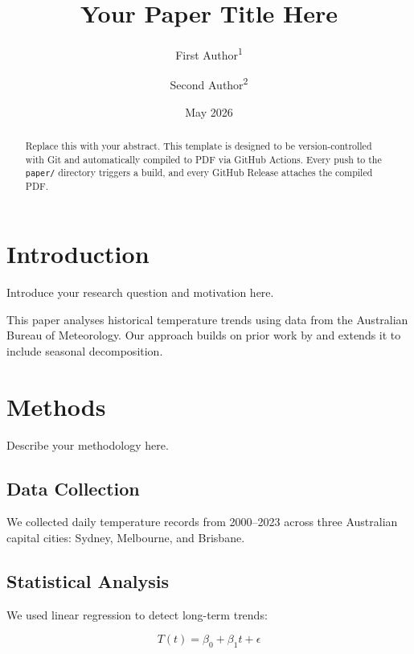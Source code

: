\documentclass[12pt, a4paper]{article}
\title{Your Paper Title Here}
\author{
  First Author\textsuperscript{1} \and
  Second Author\textsuperscript{2}
}
\date{May 2026}
\begin{document}
\maketitle

\begin{abstract}
  Replace this with your abstract. This template is designed to be
  version-controlled with Git and automatically compiled to PDF via
  GitHub Actions. Every push to the \texttt{paper/} directory triggers
  a build, and every GitHub Release attaches the compiled PDF.
\end{abstract}

\tableofcontents
\newpage

\section{Introduction}
\label{sec:introduction}

Introduce your research question and motivation here.

This paper analyses historical temperature trends using data from the
Australian Bureau of Meteorology. Our approach builds on prior work by
\citet{example2024} and extends it to include seasonal decomposition.

\section{Methods}
\label{sec:methods}

Describe your methodology here.

\subsection{Data Collection}

We collected daily temperature records from 2000--2023 across three
Australian capital cities: Sydney, Melbourne, and Brisbane.

\subsection{Statistical Analysis}

We used linear regression to detect long-term trends:

\begin{equation}
  T(t) = \beta_0 + \beta_1 t + \epsilon
  \label{eq:trend}
\end{equation}
\end{document}
